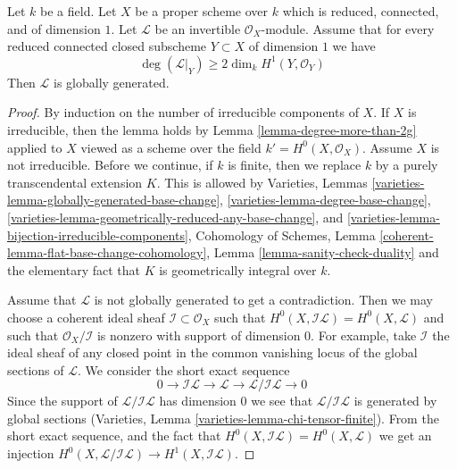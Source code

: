 \begin{lemma}
\label{lemma-global-generation}
Let $k$ be a field. Let $X$ be a proper scheme over $k$
which is reduced, connected, and of dimension $1$.
Let $\mathcal{L}$ be an invertible $\mathcal{O}_X$-module.
Assume that for every reduced connected closed subscheme
$Y \subset X$ of dimension $1$ we have
$$
\deg(\mathcal{L}|_Y) \geq 2\dim_k H^1(Y, \mathcal{O}_Y)
$$
Then $\mathcal{L}$ is globally generated.
\end{lemma}

\begin{proof}
By induction on the number of irreducible components of $X$.
If $X$ is irreducible, then the lemma holds by
Lemma \ref{lemma-degree-more-than-2g}
applied to $X$ viewed as a scheme over the field
$k' = H^0(X, \mathcal{O}_X)$. Assume $X$ is not irreducible.
Before we continue, if $k$ is finite, then we replace $k$
by a purely transcendental extension $K$. This is allowed by
Varieties, Lemmas
\ref{varieties-lemma-globally-generated-base-change},
\ref{varieties-lemma-degree-base-change},
\ref{varieties-lemma-geometrically-reduced-any-base-change}, and
\ref{varieties-lemma-bijection-irreducible-components},
Cohomology of Schemes, Lemma \ref{coherent-lemma-flat-base-change-cohomology},
Lemma \ref{lemma-sanity-check-duality} and the elementary fact that
$K$ is geometrically integral over $k$.

\medskip\noindent
Assume that $\mathcal{L}$ is not globally generated to get a contradiction.
Then we may choose a coherent ideal sheaf
$\mathcal{I} \subset \mathcal{O}_X$ such that
$H^0(X, \mathcal{I}\mathcal{L}) = H^0(X, \mathcal{L})$
and such that $\mathcal{O}_X/\mathcal{I}$ is nonzero with
support of dimension $0$. For example, take $\mathcal{I}$
the ideal sheaf of any closed point in the common
vanishing locus of the global sections of $\mathcal{L}$.
We consider the short exact sequence
$$
0 \to \mathcal{I}\mathcal{L} \to \mathcal{L} \to 
\mathcal{L}/\mathcal{I}\mathcal{L} \to 0
$$
Since the support of $\mathcal{L}/\mathcal{I}\mathcal{L}$
has dimension $0$ we see that $\mathcal{L}/\mathcal{I}\mathcal{L}$
is generated by global sections
(Varieties, Lemma \ref{varieties-lemma-chi-tensor-finite}).
From the short exact sequence,
and the fact that $H^0(X, \mathcal{I}\mathcal{L}) = H^0(X, \mathcal{L})$
we get an injection
$H^0(X, \mathcal{L}/\mathcal{I}\mathcal{L}) \to H^1(X, \mathcal{I}\mathcal{L})$.


\end{proof}
